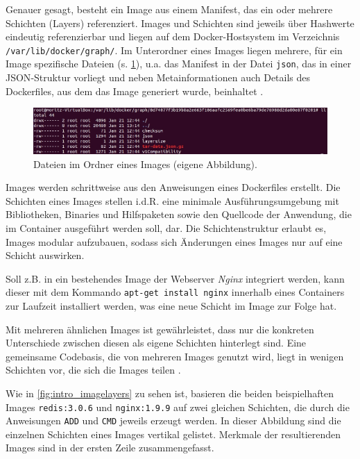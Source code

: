 \documentclass[../main.tex]{subfiles}
\begin{document}
			Genauer gesagt, besteht ein Image aus einem Manifest, das ein oder mehrere Schichten (Layers) referenziert. Images und Schichten sind jeweils über Hashwerte eindeutig referenzierbar und liegen auf dem Docker-Hostsystem im Verzeichnis \texttt{/var/lib/docker/graph/}. Im Unterordner eines Images liegen mehrere, für ein Image spezifische Dateien (s. \fig \ref{fig:intro_dockerImageVZ}), u.a. das Manifest in der Datei \texttt{json}, das in einer \acrshort{JSON}-Struktur vorliegt und neben Metainformationen auch Details des Dockerfiles, aus dem das Image generiert wurde, beinhaltet \cite{githubDockerGlossary}.

			\begin{figure}[!htbp]
          \centering
          \includegraphics[width=1.0\textwidth]{./images/intro_dockerImageVZ.jpg}
          \caption{Dateien im Ordner eines Images (eigene Abbildung).}
          \label{fig:intro_dockerImageVZ}
      \end{figure}

			Images werden schrittweise aus den Anweisungen eines Dockerfiles erstellt. Die Schichten eines Images stellen i.d.R. eine minimale Ausführungsumgebung mit Bibliotheken, Binaries und Hilfspaketen sowie den Quellcode der Anwendung, die im Container ausgeführt werden soll, dar. Die Schichtenstruktur erlaubt es, Images modular aufzubauen, sodass sich Änderungen eines Images nur auf eine Schicht auswirken.

			Soll z.B. in ein bestehendes Image der Webserver \emph{Nginx} integriert werden, kann dieser mit dem Kommando \texttt{apt-get install nginx} innerhalb eines Containers zur Laufzeit installiert werden, was eine neue Schicht im Image zur Folge hat.

			Mit mehreren ähnlichen Images ist gewährleistet, dass nur die konkreten Unterschiede zwischen diesen als eigene Schichten hinterlegt sind. Eine gemeinsame Codebasis, die von mehreren Images genutzt wird, liegt in wenigen Schichten vor, die sich die Images teilen \cite[S.3]{dockerIntroIEEE}.

			Wie in \fig \ref{fig:intro_imagelayers} zu sehen ist, basieren die beiden beispielhaften Images \texttt{redis:3.0.6} und \texttt{nginx:1.9.9} auf zwei gleichen Schichten, die durch die Anweisungen \texttt{ADD} und \texttt{CMD} jeweils erzeugt werden. In dieser Abbildung sind die einzelnen Schichten eines Images vertikal gelistet. Merkmale der resultierenden Images sind in der ersten Zeile zusammengefasst.
\end{document}
